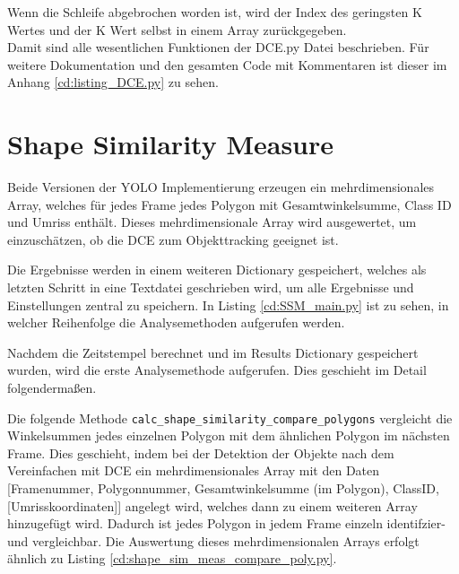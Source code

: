{	
	Wenn die Schleife abgebrochen worden ist, wird der Index des geringsten K Wertes und der K Wert selbst in einem Array zurückgegeben.\\
	Damit sind alle wesentlichen Funktionen der DCE.py Datei beschrieben. Für weitere Dokumentation und den gesamten Code mit Kommentaren ist dieser im Anhang \ref{cd:listing_DCE.py} zu sehen.
}


\section{Shape Similarity Measure}{
	\label{py:Shape_Sim_Meas}
	Beide Versionen der YOLO Implementierung erzeugen ein mehrdimensionales Array, welches für jedes Frame jedes Polygon mit Gesamtwinkelsumme, Class ID und Umriss enthält. Dieses mehrdimensionale Array wird ausgewertet, um einzuschätzen, ob die DCE zum Objekttracking geeignet ist. 

	Die Ergebnisse werden in einem weiteren Dictionary gespeichert, welches als letzten Schritt in eine Textdatei geschrieben wird, um alle Ergebnisse und Einstellungen zentral zu speichern. In Listing \ref{cd:SSM_main.py} ist zu sehen, in welcher Reihenfolge die Analysemethoden aufgerufen werden. 
	
	Nachdem die Zeitstempel berechnet und im Results Dictionary gespeichert wurden, wird die erste Analysemethode aufgerufen. Dies geschieht im Detail folgendermaßen.

	Die folgende Methode \lstinline|calc_shape_similarity_compare_polygons| vergleicht die Winkelsummen jedes einzelnen Polygon mit dem ähnlichen Polygon im nächsten Frame. Dies geschieht, indem bei der Detektion der Objekte nach dem Vereinfachen mit DCE ein mehrdimensionales Array mit den Daten [Framenummer, Polygonnummer, Gesamtwinkelsumme (im Polygon), ClassID, [Umrisskoordinaten]] angelegt wird, welches dann zu einem weiteren Array hinzugefügt wird. Dadurch ist jedes Polygon in jedem Frame einzeln identifzier- und vergleichbar. 
	Die Auswertung dieses mehrdimensionalen Arrays erfolgt ähnlich zu Listing \ref{cd:shape_sim_meas_compare_poly.py}.\\

}
